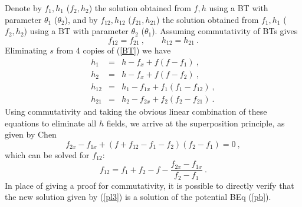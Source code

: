 \documentclass[12pt]{article}
\begin{document}
Denote by $f_1,h_1$ ($f_2,h_2$) the solution obtained from $f,h$ using a BT with parameter $\theta_1$ ($\theta_2$),
and by $f_{12},h_{12}$ ($f_{21},h_{21}$) the solution obtained from $f_1,h_1$ ($f_2,h_2$)  using a BT with parameter $\theta_2$
($\theta_1$). Assuming commutativity of BTs gives
$$  f_{12} = f_{21}\ , \qquad h_{12} = h_{21}\ . $$
Eliminating $s$ from 4 copies of (\ref{BT}) we have
\begin{eqnarray*}
h_1  &=& h - f_x + f(f-f_1) \ ,   \\
h_2  &=& h - f_x + f(f-f_2) \ ,   \\
h_{12} &=& h_1 - f_{1x} + f_1(f_1-f_{12}) \ , \\ 
h_{21} &=& h_2 - f_{2x} + f_2(f_2-f_{21}) \ . 
\end{eqnarray*}
Using commutativity and
taking the obvious linear combination of these equations to eliminate all $h$ fields, we arrive at the 
superposition principle, as given by Chen \cite{beq45}
\begin{equation} 
  f_{2x}-f_{1x} + (f + f_{12} - f_1 - f_2)(f_2-f_1)  = 0\ , \label{pl2} 
\end{equation}
which can be solved for $f_{12}$: 
\begin{equation} 
f_{12}  =  f_1 + f_2 - f - \frac{f_{2x}-f_{1x}}{f_2-f_1}\ .   \label{pl3} 
\end{equation}
In place of giving a proof for commutativity, it is possible to directly verify that the new solution
given by (\ref{pl3}) is a solution of the potential BEq (\ref{pb}). 
\end{document}
